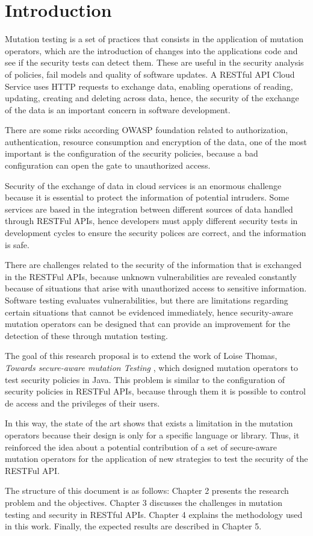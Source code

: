 \chapter*{Introduction}

Mutation testing is a set of practices that consists in the application of mutation operators, which are the introduction of changes into the applications code and see if the security tests can detect them. These are useful in the security analysis of policies\cite{8967426}, fail models\cite{6569774} and quality of software updates\cite{kravets2012feasibility}. A RESTful API Cloud Service uses HTTP requests to exchange data, enabling operations of reading, updating, creating and deleting across data, hence, the security of the exchange of the data is an important concern in software development.

There are some risks according OWASP foundation related to authorization, authentication, resource consumption and encryption of the data, one of the most important is the configuration of the security policies, because a bad configuration can open the gate to unauthorized access.

Security of the exchange of data in cloud services is an enormous challenge because it is essential to protect the information of potential intruders. Some services are based in the integration between different sources of data handled through RESTFul APIs, hence developers must apply different security tests in development cycles to ensure the security polices are correct, and the information is safe.

There are challenges related to the security of the information that is exchanged in the RESTFul APIs, because unknown vulnerabilities are revealed constantly because of situations that arise with unauthorized access to sensitive information. Software testing evaluates vulnerabilities, but there are limitations regarding certain situations that cannot be evidenced immediately, hence security-aware mutation operators can be designed that can provide an improvement for the detection of these through mutation testing.

The goal of this research proposal is to extend the work of Loise Thomas, \textit{Towards secure-aware mutation Testing} \cite{Loise2017}, which designed mutation operators to test security policies in Java. This problem is similar to the configuration of security policies in RESTFul APIs, because through them it is possible to control de access and the privileges of their users.

In this way, the state of the art shows that exists a limitation in the mutation operators because their design is only for a specific language or library. Thus, it reinforced the idea about a potential contribution of a set of secure-aware mutation operators for the application of new strategies to test the security of the RESTFul API.

The structure of this document is as follows: Chapter 2 presents the research problem and the objectives. Chapter 3 discusses the challenges in mutation testing and security in RESTful APIs. Chapter 4 explains the methodology used in this work. Finally, the expected results are described in Chapter 5.
